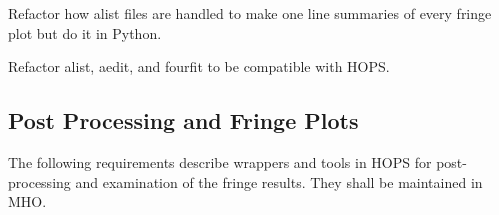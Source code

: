 \begin{description}
 Refactor how alist files are handled to make one line
    summaries of every fringe plot but do it in Python.
    
 Refactor alist, aedit, and fourfit to be compatible with \ac{HOPS}.

    
%

\end{description}



\subsection{Post Processing and Fringe Plots}
\label{sec:postprocreq}
The following requirements describe wrappers and tools
 in HOPS for post-processing and examination of the fringe results.
They shall be maintained in MHO. 


